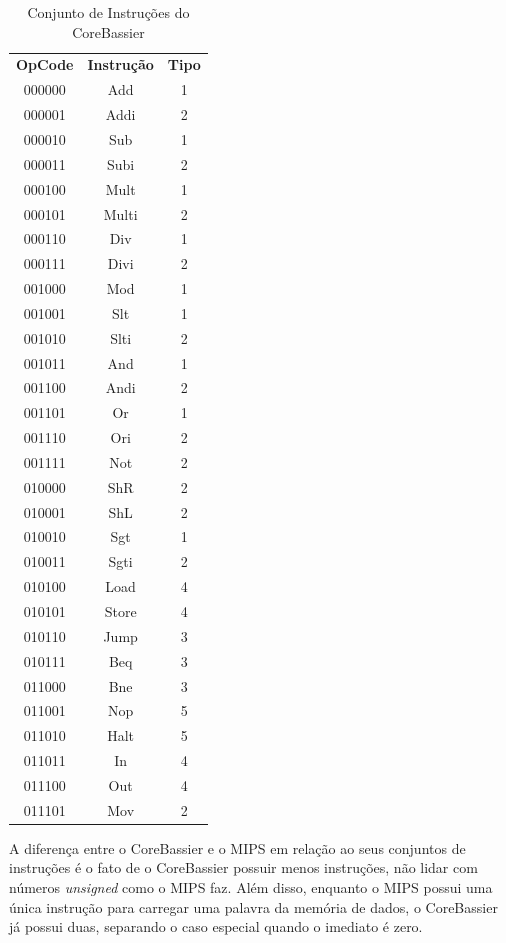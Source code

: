 \documentclass[
	12pt,
	openright,
	a4paper,
	english,			
	french,				
	spanish,			
	brazil,				
	]{abntex2}
\begin{document}
\begin{table}[htb]
\centering
\ABNTEXfontereduzida
\caption{Conjunto de Instruções do CoreBassier} \label{tab:Instr3OP5}
\begin{tabular}{ ccc }
 	\textbf{OpCode} & \textbf{Instrução} & \textbf{Tipo}\\
 	000000 & Add & 1\\
 	000001 & Addi & 2\\
 	000010 & Sub  & 1\\
 	000011 & Subi & 2\\
 	000100 & Mult & 1\\
 	000101 & Multi & 2\\
 	000110 & Div & 1\\
 	000111 & Divi & 2\\
 	001000 & Mod & 1\\
 	001001 & Slt & 1\\	
 	001010 & Slti & 2\\
 	001011 & And & 1\\
 	001100 & Andi & 2\\
 	001101 & Or & 1\\
 	001110 & Ori & 2\\
 	001111 & Not & 2\\
 	010000 & ShR & 2\\
 	010001 & ShL & 2\\
 	010010 & Sgt & 1\\
 	010011 & Sgti & 2\\
 	010100 & Load & 4\\
 	010101 & Store & 4\\
 	010110 & Jump & 3\\
 	010111 & Beq & 3\\
 	011000 & Bne & 3\\
 	011001 & Nop & 5\\
 	011010 & Halt & 5\\
 	011011 & In & 4\\
	011100 & Out & 4\\
	011101 & Mov & 2\\ 
  \end{tabular}
\end{table}

A diferença entre o CoreBassier e o MIPS em relação ao seus conjuntos de instruções é o fato de o CoreBassier possuir menos instruções, não lidar com números \emph{unsigned} como o MIPS faz.
Além disso, enquanto o MIPS possui uma única instrução para carregar uma palavra da memória de dados, o CoreBassier já possui duas, separando o caso especial quando o imediato é zero.
\end{document}
